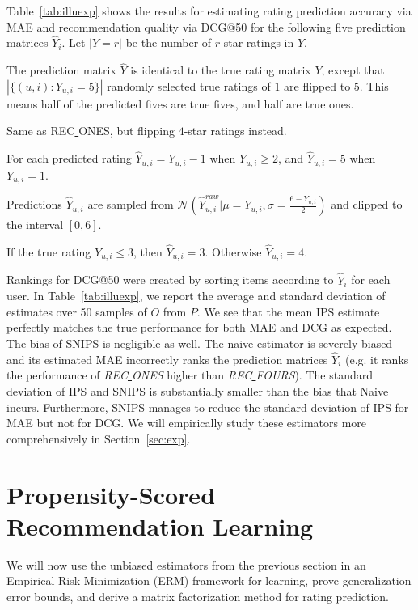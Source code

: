 \documentclass{article}
\newcommand{\user}{u}                       %
\newcommand{\movie}{i}                      %
\newcommand{\ytrue}{Y}                      %
\newcommand{\ytrueelem}[1]{\ytrue_{#1}}
\newcommand{\ytrueum}{\ytrueelem{\user,\movie}}
\newcommand{\ypred}{\hat{Y}}                %
\newcommand{\ypredelem}[1]{\ypred_{#1}}
\newcommand{\ypredum}{\ypredelem{\user,\movie}}
\newcommand{\obs}{O}                        %
\newcommand{\probobs}{P}                    %
\begin{document}
Table~\ref{tab:illuexp} shows the results for estimating rating prediction accuracy via MAE and recommendation quality via DCG@50 for the following five prediction matrices $\ypred_i$. Let $|\ytrue=r|$ be the number of $r$-star ratings in $\ytrue$.
\begin{compactdesc}
    \item[REC\underline{{ }{ }}ONES:] The prediction matrix $\ypred$ is identical to the true rating matrix $\ytrue$, except that $|\{(\user,\movie):\ytrueum=5\}|$ randomly selected true ratings of $1$ are flipped to $5$. This means half of the predicted fives are true fives, and half are true ones. 
    \item[REC\underline{{ }{ }}FOURS:] Same as REC\underline{{ }{ }}ONES, but flipping $4$-star ratings instead. 
    \item[ROTATE:] For each predicted rating $\ypredum = \ytrueum - 1$ when $\ytrueum \ge 2$, and $\ypredum = 5$ when $\ytrueum = 1$.
    \item[SKEWED:] Predictions $\ypredum$ are sampled from $\mathcal{N}(\ypredum^{raw}|\mu=\ytrueum,\sigma=\frac{6-\ytrueum}{2})$ and clipped to the interval $[0,6]$.
    \item[COARSENED:] If the true rating $\ytrueum \le 3$, then $\ypredum=3$. Otherwise $\ypredum=4$.
\end{compactdesc}
Rankings for DCG@50 were created by sorting items according to $\ypred_i$ for each user.
In Table~\ref{tab:illuexp}, we report the average and standard deviation of estimates over 50 samples of $\obs$ from $\probobs$.
We see that the mean IPS estimate perfectly matches the true performance for both MAE and DCG as expected.
The bias of SNIPS is negligible as well. The naive estimator is severely biased and its estimated MAE incorrectly ranks the prediction matrices $\ypred_i$ (e.g. it ranks the performance of \emph{REC\underline{{ }{ }}ONES} higher than \emph{REC\underline{{ }{ }}FOURS}). The standard deviation of IPS and SNIPS is substantially smaller than the bias that Naive incurs. Furthermore, SNIPS manages to reduce the standard deviation of IPS for MAE but not for DCG. We will empirically study these estimators more comprehensively in Section~\ref{sec:exp}. 

\section{Propensity-Scored Recommendation Learning}
We will now use the unbiased estimators from the previous section in an Empirical Risk Minimization (ERM) framework for learning, prove generalization error bounds, and derive a matrix factorization method for rating prediction.
\end{document}
